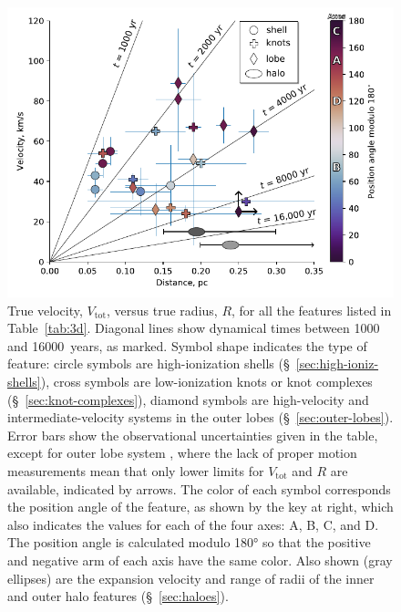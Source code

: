 \documentclass[useAMS, usenatbib]{mnras}
\begin{document}
\begin{figure}
  \includegraphics[width=\linewidth]
  {figs/vel-radius-systems-annotated}
  \caption{
    True velocity, \(V_{\text{tot}}\), versus true radius, \(R\), for all the features listed in Table~\ref{tab:3d}.
    Diagonal lines show dynamical times between \num{1000} and \SI{16000}{years}, as marked.
    Symbol shape indicates the type of feature:
    circle symbols are high-ionization shells (\S~\ref{sec:high-ioniz-shells}),
    cross symbols are low-ionization knots or knot complexes (\S~\ref{sec:knot-complexes}),
    diamond symbols are high-velocity and intermediate-velocity systems in the outer lobes (\S~\ref{sec:outer-lobes}).
    Error bars show the observational uncertainties given in the table,
    except for outer lobe system , where the lack of proper motion measurements mean that only lower limits for \(V_{\text{tot}}\) and \(R\) are available, indicated by arrows.
    The color of each symbol corresponds the position angle of the feature, as shown by the key at right,
    which also indicates the values for each of the four axes: A, B, C, and D.
    The position angle is calculated modulo \ang{180} so that the positive and negative arm of each axis have the same color.
    Also shown (gray ellipses) are the expansion velocity and range of radii of the inner and outer halo features (\S~\ref{sec:haloes}).
      }
  \label{fig:ages}
\end{figure}
\end{document}
